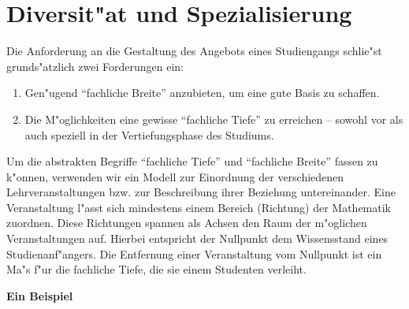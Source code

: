 \newpage
\section{Diversit"at und Spezialisierung}

Die Anforderung an die Gestaltung des Angebots eines Studiengangs schlie"st grunds"atzlich zwei Forderungen ein: 
\begin{enumerate}
	\item Gen"ugend "`fachliche Breite"' anzubieten, um eine gute Basis zu schaffen.
	\item Die M"oglichkeiten eine gewisse "`fachliche Tiefe"' zu erreichen -- sowohl vor als auch speziell in der Vertiefungsphase des Studiums.
\end{enumerate}

Um die abstrakten Begriffe "`fachliche Tiefe"' und "`fachliche
Breite"' fassen zu k"onnen, verwenden wir ein Modell zur Einordnung
der verschiedenen Lehrveranstaltungen bzw. zur Beschreibung ihrer
Beziehung untereinander.  Eine Veranstaltung l"asst sich mindestens
einem Bereich (Richtung) der Mathematik zuordnen. Diese Richtungen
spannen als Achsen den Raum der m"oglichen Veranstaltungen auf.
Hierbei entspricht der Nullpunkt dem Wissensstand eines Studienanf"angers.
Die Entfernung einer Veranstaltung vom Nullpunkt ist ein Ma"s f"ur
die fachliche Tiefe, die sie einem Studenten verleiht.

\begin{center}
\textbf{Ein Beispiel}\\
\end{center}

